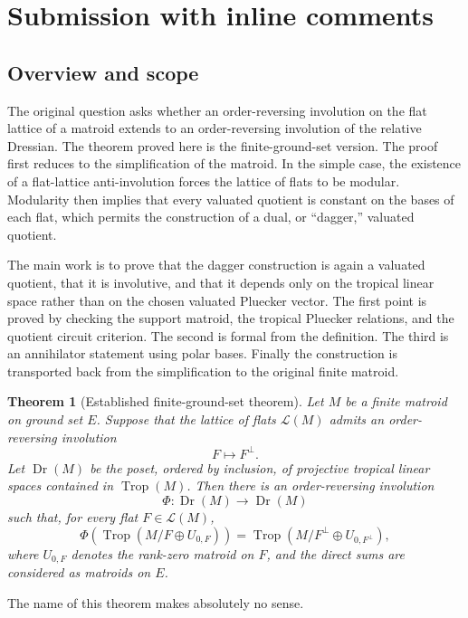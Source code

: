 \documentclass[12pt]{article}
\newtheorem{theorem}{Theorem}
\theoremstyle{definition}
\newcommand{\Trop}{\operatorname{Trop}}
\newcommand{\Dr}{\operatorname{Dr}}
\newcommand{\cL}{\mathcal L}
\newcommand{\review}[1]{\begin{reviewbox}#1\end{reviewbox}}
\begin{document}
  \section{Submission with inline comments}


\date{}


\subsection*{Overview and scope}

The original question asks whether an order-reversing involution on the flat lattice of a matroid extends to an order-reversing involution of the relative Dressian.  The theorem proved here is the finite-ground-set version.  The proof first reduces to the simplification of the matroid.  In the simple case, the existence of a flat-lattice anti-involution forces the lattice of flats to be modular.  Modularity then implies that every valuated quotient is constant on the bases of each flat, which permits the construction of a dual, or ``dagger,'' valuated quotient.

The main work is to prove that the dagger construction is again a valuated quotient, that it is involutive, and that it depends only on the tropical linear space rather than on the chosen valuated Pluecker vector.  The first point is proved by checking the support matroid, the tropical Pluecker relations, and the quotient circuit criterion.  The second is formal from the definition.  The third is an annihilator statement using polar bases.  Finally the construction is transported back from the simplification to the original finite matroid.

\begin{theorem}[Established finite-ground-set theorem]\label{thm:main}
Let \(M\) be a finite matroid on ground set \(E\).  Suppose that the lattice of flats \(\cL(M)\) admits an order-reversing involution
\[
F\longmapsto F^\perp .
\]
Let \(\Dr(M)\) be the poset, ordered by inclusion, of projective tropical linear spaces contained in \(\Trop(M)\).  Then there is an order-reversing involution
\[
\Phi:\Dr(M)\longrightarrow \Dr(M)
\]
such that, for every flat \(F\in \cL(M)\),
\[
\Phi\!\left(\Trop(M/F\oplus U_{0,F})\right)
=
\Trop(M/F^\perp\oplus U_{0,F^\perp}),
\]
where \(U_{0,F}\) denotes the rank-zero matroid on \(F\), and the direct sums are considered as matroids on \(E\).
\end{theorem}
\review{The name of this theorem makes absolutely no sense.}
\end{document}
